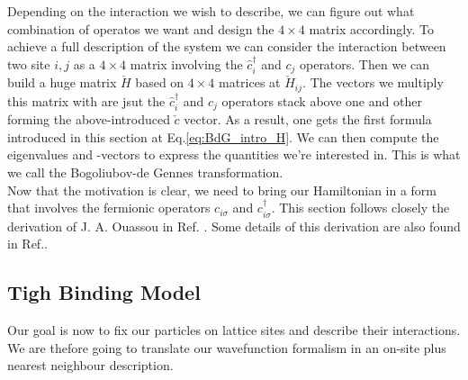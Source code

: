\documentclass[../main.tex]{subfile}
\begin{document}
Depending on the interaction we wish to describe, we can figure out what combination of operatos we want and design the $4\times4$ matrix accordingly.
To achieve a full description of the system we can consider the interaction between two site $i,j$ as a $4\times4$ matrix involving the $\hat{c}_i^{\dagger}$ and $c_j$ operators.
Then we can build a huge matrix $\check{H}$ based on $4\times4$ matrices at $\check{H}_{ij}$. The vectors we multiply this matrix with are jsut the $\hat{c}_i^{\dagger}$ and $c_j$ operators 
stack above one and other forming the above-introduced $\check{c}$ vector. As a result, one gets the first formula introduced in this section at Eq.\ref{eq:BdG_intro_H}.
We can then compute the eigenvalues and -vectors to express the quantities we're interested in. This is what we call the Bogoliubov-de Gennes transformation.\\

Now that the motivation is clear, we need to bring our Hamiltonian in a form that involves the fermionic operators $c_{i\sigma}$ and $c_{i\sigma}^{\dagger}$. 
This section follows closely the derivation of J. A. Ouassou in Ref. \cite{Ouassou_unpubl}. Some details of this derivation are also found in Ref.\cite{Ouassou2024}.
 
\subsection{Tigh Binding Model}
Our goal is now to fix our particles on lattice sites and describe their interactions. We are thefore going to translate our wavefunction formalism in an on-site plus
nearest neighbour description.\\
\end{document}
